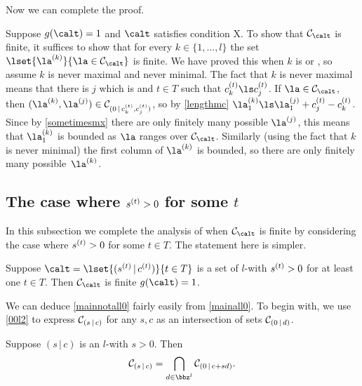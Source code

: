 \documentclass[a4paper, 11pt, twoside]{article}
\begin{document}
Now we can complete the proof.

\begin{pf}
Suppose $g(\calt)=1$ and $\calt$ satisfies condition X. To show that $\smc\calt$ is finite, it suffices to show that for every $k\in\{1,\dots,l\}$ the set $\lset{\cpt\la k}{\la\in\smc\calt}$ is finite. We have proved this when $k$ is \smx or \smn, so assume $k$ is never maximal and never minimal. The fact that $k$ is never maximal means that there is $j$ which is \smx and $t\in T$ such that $\sof ct_k\ls \sof ct_j$. If $\la\in\smc\calt$, then $(\cpt\la k,\cpt\la j)\in\mc0{\sof ct_k,\sof ct_j}$, so by \cref{lengthmc} $\cpt\la k_1\ls\cpt\la j_1+\sof ct_j-\sof ct_k$. Since by \cref{sometimesmx} there are only finitely many possible $\cpt\la j$, this means that $\cpt\la k_1$ is bounded as $\la$ ranges over $\smc\calt$. Similarly (using the fact that $k$ is never minimal) the first column of $\cpt\la k$ is bounded, so there are only finitely many possible~$\cpt\la k$.
\end{pf}

\subsection{The case where $s^{(t)}>0$ for some $t$}\label{finitesec}

In this subsection we complete the analysis of when $\smc\calt$ is finite by considering the case where $s^{(t)}>0$ for some $t\in T$. The statement here is simpler.

\smallskip
\begin{mdframed}[innerleftmargin=3pt,innerrightmargin=3pt,innertopmargin=-6pt,innerbottommargin=3pt,roundcorner=5pt,innermargin=-3pt,outermargin=-3pt]
\begin{thm}\label{mainnotall0}
Suppose $\calt=\lset{(\sof st\,|\,\sof ct)}{t\in T}$ is a set of $l$-\mcds with $s^{(t)}>0$ for at least one $t\in T$. Then $\smc\calt$ is finite \iff $g(\calt)=1$.
\end{thm}
\end{mdframed}
\smallskip

We can deduce \cref{mainnotall0} fairly easily from \cref{mainall0}. To begin with, we use \cref{00l2} to express $\mathcal{C}_{(s\,|\,c)}$ for any $s,c$ as an intersection of sets $\mathcal{C}_{(0\,|\,d)}$.

\begin{propn}\label{intersect}
Suppose $(s\,|\,c)$ is an $l$-\mcd with $s>0$. Then
\[
\mc sc=\bigcap_{d\in\bbz^l}\mc0{c+sd}.
\]
\end{propn}
\end{document}
